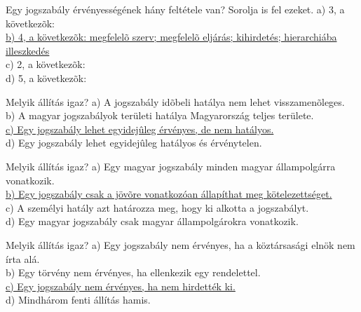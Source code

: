 \begin{frame}

\begin{tcolorbox}[title={25. Kérdés}]
Egy jogszabály érvényességének hány feltétele van? Sorolja is fel ezeket.
\tcblower
a) 3, a következõk:\\
\uline {b) 4, a következõk: megfelelõ szerv; megfelelõ eljárás; kihirdetés; hierarchiába illeszkedés}\\
c) 2, a következõk:\\
d) 5, a következõk:
\end{tcolorbox}

\begin{tcolorbox}[title={26. Kérdés}]
Melyik állítás igaz?
\tcblower
a) A jogszabály idõbeli hatálya nem lehet visszamenõleges.\\
b) A magyar jogszabályok területi hatálya Magyarország teljes területe.\\
\uline {c) Egy jogszabály lehet egyidejûleg érvényes, de nem hatályos.}\\
d) Egy jogszabály lehet egyidejûleg hatályos és érvénytelen.
\end{tcolorbox}

\begin{tcolorbox}[title={27. Kérdés}]
Melyik állítás igaz?
\tcblower
a) Egy magyar jogszabály minden magyar állampolgárra vonatkozik.\\
\uline {b) Egy jogszabály csak a jövõre vonatkozóan állapíthat meg kötelezettséget.}\\
c) A személyi hatály azt határozza meg, hogy ki alkotta a jogszabályt.\\
d) Egy magyar jogszabály csak magyar állampolgárokra vonatkozik.
\end{tcolorbox}

\begin{tcolorbox}[title={28. Kérdés}]
Melyik állítás igaz?
\tcblower
a) Egy jogszabály nem érvényes, ha a köztársasági elnök nem írta alá.\\
b) Egy törvény nem érvényes, ha ellenkezik egy rendelettel.\\
\uline {c) Egy jogszabály nem érvényes, ha nem hirdették ki.}\\
d) Mindhárom fenti állítás hamis.
\end{tcolorbox}

\end{frame}



